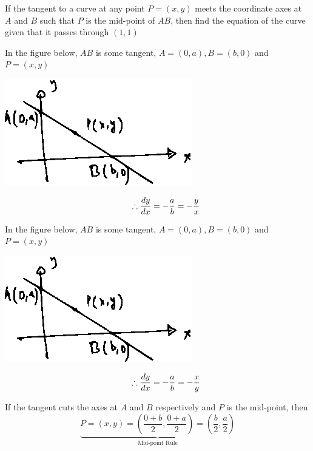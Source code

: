 \documentclass[14pt,fleqn]{extarticle}
\begin{document}
 
\begin{problem}
	\statement 
    
    If the tangent to a curve at any point $P = (x,y)$ meets the coordinate
    axes at $A$ and $B$ such that $P$ is the mid-point of $AB$, then find the equation 
    of the curve given that it passes through $(1,1)$
    
    \begin{step}
  \begin{options} 
     \correct 
       
       In the figure below, $AB$ is some tangent, $A = (0,a), B = (b,0)$ and $P=(x,y)$ 
       
       \begin{center}
\includegraphics[scale=1.4]{1417-A.eps}
\end{center}

     \[\qquad \therefore \frac{dy}{dx} = -\frac{a}{b} = -\frac{y}{x} \]
       
     \incorrect
     
     In the figure below, $AB$ is some tangent, $A = (0,a), B = (b,0)$ and $P=(x,y)$ 
       
       \begin{center}
\includegraphics[scale=1.4]{1417-A.eps}
\end{center}

     \[\qquad \therefore \frac{dy}{dx} = -\frac{a}{b} = -\frac{x}{y} \]
        
    \end{options} 
     \reason 
     
     If the tangent cuts the axes at $A$ and $B$ respectively and $P$ 
     is the mid-point, then 
     \[ \underbrace{P = \left(x,y \right) = \left(\frac{0+b}{2},\frac{0+a}{2} \right) = \left(\frac{b}{2}, \frac{a}{2} \right)}_{\text{Mid-point Rule}} \]
       

\end{step}
\end{problem}
\end{document}
